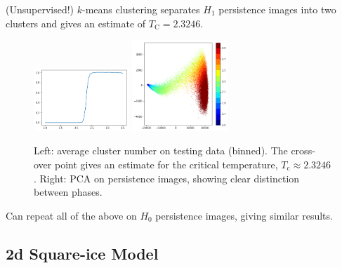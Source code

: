 \documentclass[11pt]{article}
\begin{document}
(Unsupervised!) $k$-means clustering separates $H_1$ persistence images into two clusters and gives an estimate of $T_\text{C}=2.3246$.

\begin{figure}[h]
    \centering
    \includegraphics[width=0.32\textwidth]{ising_images/kmeans_avg_2d_ising}
    \includegraphics[width=0.32\textwidth]{ising_images/pca_2d_ising}
    \caption{Left: average cluster number on testing data (binned). The cross-over point gives an estimate for the critical temperature, $T_\text{c}\approx 2.3246$. Right: PCA on persistence images, showing clear distinction between phases.}
\end{figure}

Can repeat all of the above on $H_0$ persistence images, giving similar results.

\subsection{2d Square-ice Model}
\end{document}

